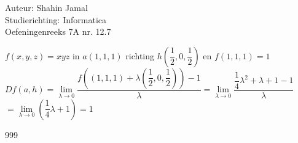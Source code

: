 \documentclass[a4paper]{article}
\begin{document}
  
\noindent \large Auteur: Shahin Jamal \\
\noindent \large Studierichting: Informatica\\
\noindent \large Oefeningenreeks 7A nr. 12.7\\

\medskip

\normalsize

$f(x,y,z) = xyz $ in $ a(1, 1, 1)$ richting $h\left(\dfrac{1}{2}, 0, \dfrac{1}{2}\right)$ en $f(1, 1, 1) = 1$\\

$Df(a, h) = \lim\limits_{\lambda \rightarrow 0} \dfrac{f\left((1, 1, 1) + \lambda\left(\dfrac{1}{2}, 0, \dfrac{1}{2}\right)\right) - 1}{\lambda} = \lim\limits_{\lambda \rightarrow 0} \dfrac{\dfrac{1}{4}\lambda^2 + \lambda + 1 - 1}{\lambda}$\\

$= \lim\limits_{\lambda \rightarrow 0} \left(\dfrac{1}{4}\lambda + 1\right) = 1$\\

\begin{thebibliography}{999}
\end{thebibliography}
\end{document}

